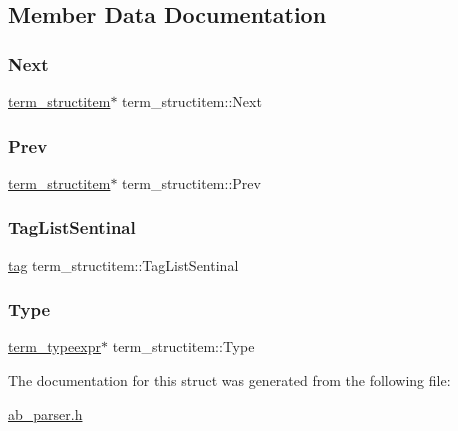 \subsection{Member Data Documentation}
\mbox{\label{structterm__structitem_a92becd37fab5b7e4b326e3111c6a7c40}} 
\subsubsection{\texorpdfstring{Next}{Next}}
{\footnotesize\ttfamily \hyperlink{structterm__structitem}{term\+\_\+structitem}$\ast$ term\+\_\+structitem\+::\+Next}

\mbox{\label{structterm__structitem_a724d81ad66a76f54b153a97a8b175b7d}} 
\subsubsection{\texorpdfstring{Prev}{Prev}}
{\footnotesize\ttfamily \hyperlink{structterm__structitem}{term\+\_\+structitem}$\ast$ term\+\_\+structitem\+::\+Prev}

\mbox{\label{structterm__structitem_a25c03f6130b24c035dadd65fbe5f0110}} 
\subsubsection{\texorpdfstring{Tag\+List\+Sentinal}{TagListSentinal}}
{\footnotesize\ttfamily \hyperlink{structtag}{tag} term\+\_\+structitem\+::\+Tag\+List\+Sentinal}

\mbox{\label{structterm__structitem_ac2a7c2261f1714cedb33376eb440e66c}} 
\subsubsection{\texorpdfstring{Type}{Type}}
{\footnotesize\ttfamily \hyperlink{structterm__typeexpr}{term\+\_\+typeexpr}$\ast$ term\+\_\+structitem\+::\+Type}



The documentation for this struct was generated from the following file\+:\begin{DoxyCompactItemize}
\item 
\hyperlink{ab__parser_8h}{ab\+\_\+parser.\+h}\end{DoxyCompactItemize}
